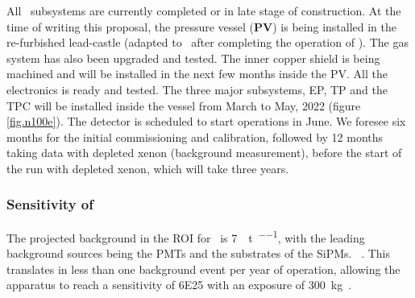 All \Next\ subsystems are currently completed or in late stage of construction. At the time of writing this proposal, the pressure vessel ({\bf PV}) is being installed in the re-furbished lead-castle (adapted to \Next\ after completing the operation of \NEW). The gas system has also been upgraded and tested. The inner copper shield is being machined and will be installed in the next few months inside the PV. All the electronics is ready and tested. The three major subsystems, EP, TP and the TPC will be installed inside the vessel from March to May, 2022 (figure \ref{fig.n100e}). The detector is scheduled to start operations in June. We foresee six months for the initial commissioning and calibration, followed by 12 months taking data with depleted xenon (background measurement), before the start of the run with depleted xenon, which will take three years. 


\subsubsection{Sensitivity of \Next}

The projected background in the ROI for \Next\ is \SI{7}{\ev\per\tonne\per\yr}, with the leading background sources being the PMTs and the substrates of the SiPMs.
~\cite{Martin-Albo:2015rhw}.  This translates in less than one background event per year of operation, allowing the apparatus to reach 
a sensitivity of \SI{6E25}{\yr} with an exposure of \SI{300}{\kg\yr}. 

\indent

